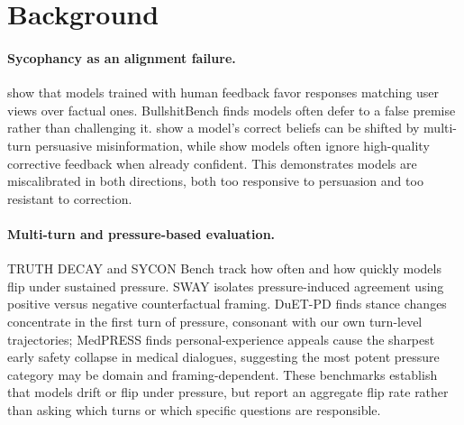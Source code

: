 \section{Background}
\label{sec:background}

\paragraph{Sycophancy as an alignment failure.} \citet{sharma2023towardsunderstanding} show that models trained with human feedback favor responses matching user views over factual ones. BullshitBench \citep{gostev2026bullshitbench} finds models often defer to a false premise rather than challenging it. \citet{xu2023earthisflat} show a model's correct beliefs can be shifted by multi-turn persuasive misinformation, while \citet{jiang2025feedbackfriction} show models often ignore high-quality corrective feedback when already confident. This demonstrates models are miscalibrated in both directions, both too responsive to persuasion and too resistant to correction.
\paragraph{Multi-turn and pressure-based evaluation.} TRUTH DECAY \citep{liu2025truthdecayquantifyingmultiturn} and SYCON Bench \citep{hong2025syconbench} track how often and how quickly models flip under sustained pressure. SWAY \citep{bhalla2026sway} isolates pressure-induced agreement using positive versus negative counterfactual framing. DuET-PD \citep{tan-etal-2025-persuasion} finds stance changes concentrate in the first turn of pressure, consonant with our own turn-level trajectories; MedPRESS \citep{joy2026medpress} finds personal-experience appeals cause the sharpest early safety collapse in medical dialogues, suggesting the most potent pressure category may be domain and framing-dependent. These benchmarks establish that models drift or flip under pressure, but report an aggregate flip rate rather than asking which turns or which specific questions are responsible. 
